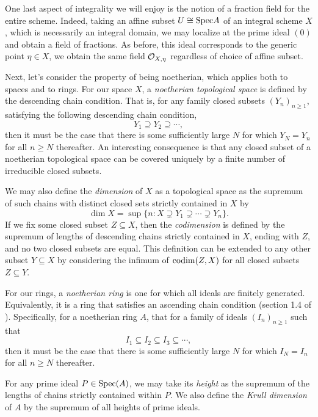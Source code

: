 One last aspect of integrality we will enjoy is the notion of a fraction field for the entire scheme.
Indeed, taking an affine subset $U \cong {\rm Spec} A$ of an integral scheme $X$, 
which is necessarily an integral domain,
we may localize at the prime ideal $(0)$ and obtain a field of fractions.
As before, this ideal corresponds to the generic point $\eta \in X$,
we obtain the same field $\mathcal{O}_{X, \eta}$ regardless of choice of affine subset.

Next, let's consider the property of being noetherian,
which applies both to spaces and to rings.
For our space $X$, 
a \textit{noetherian topological space} is defined by the descending chain condition.
That is, for any family closed subsets $(Y_n)_{n \geq 1}$,
satisfying the following descending chain condition,
\[
    Y_1 \supseteq Y_2 \supseteq \cdots,
\]
then it must be the case that there is some sufficiently large $N$ for which $Y_N = Y_n$ for all $n \geq N$ thereafter.
An interesting consequence is that any closed subset of a noetherian topological space can be covered uniquely by a finite number of irreducible closed subsets.

We may also define the \textit{dimension} of $X$ as a topological space as the supremum of such chains with distinct closed sets strictly contained in $X$  by
\[
    \dim X = \sup \{ n : X \supsetneq Y_1 \supsetneq \cdots \supsetneq Y_n \}.
\]
If we fix some closed subset $Z \subseteq X$,
then the \textit{codimension} is defined by the supremum of lengths of descending chains strictly contained in $X$, ending with $Z$,
and no two closed subsets are equal.
This definition can be extended to any other subset $Y \subseteq X$ by considering the infimum of ${\rm codim}(Z, X)$ for all closed subsets $Z \subseteq Y$.

For our rings, a \textit{noetherian ring} is one for which all ideals are finitely generated.
Equivalently, it is a ring that satisfies an ascending chain condition (section 1.4 of \cite{Eisenbud_2013}).
Specifically, for a noetherian ring $A$,
that for a family of ideals $(I_n)_{n \geq 1}$ such that
\[
    I_1 \subseteq I_2 \subseteq I_3 \subseteq \cdots,
\]
then it must be the case that there is some sufficiently large $N$ for which $I_N = I_n$ for all $n \geq N$ thereafter.

For any prime ideal $P \in {\rm Spec}(A)$, 
we may take its \textit{height} as the supremum of the lengths of chains strictly contained within $P$.
We also define the \textit{Krull dimension} of $A$ by the supremum of all heights of prime ideals.

